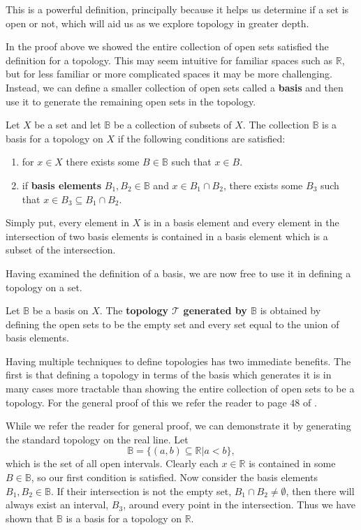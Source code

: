 \documentclass[12pt,oneside]{amsbook}
\newenvironment{defn}[1][Definition.]{\begin{trivlist}
\item[\hskip \labelsep {\bfseries #1}]}{\end{trivlist}}
\newcommand{\R}{\mathbb{R}}
\newcommand{\T}{\mathcal{T}}
\newcommand{\B}{\mathbb{B}}
\begin{document}
This is a powerful definition, principally because it helps us determine if a set is open or not, which will aid us as we explore topology in greater depth.

In the proof above we showed the entire collection of open sets satisfied the definition for a topology. This may seem intuitive for familiar spaces such as $\R$, but for less familiar or more complicated spaces it may be more challenging. Instead, we can define a smaller collection of open sets called a \textbf{basis} and then use it to generate the remaining open sets in the topology.

\begin{defn}
Let $X$ be a set and let $\mathbb{B}$ be a collection of subsets of $X$. The collection $\mathbb{B}$ is a basis for a topology on $X$ if the following conditions are satisfied:
\begin{enumerate}
\item for $x\in X$ there exists some $B\in \mathbb{B}$ such that $x\in B$.
\item if \textbf{basis elements} $B_1, B_2 \in \mathbb{B}$ and $x\in B_1 \cap B_2$, there exists some $B_3$ such that $x \in B_3 \subseteq B_1 \cap B_2$.\cite{factory}
\end{enumerate}
\end{defn}

Simply put, every element in $X$ is in a basis element and every element in the intersection of two basis elements is contained in a basis element which is a subset of the intersection.

Having examined the definition of a basis, we are now free to use it in defining a topology on a set.

\begin{defn}
Let $\B$ be a basis on $X$. The \textbf{topology $\T$ generated by $\B$} is obtained by defining the open sets to be the empty set and every set equal to the union of basis elements.
\end{defn}

Having multiple techniques to define topologies has two immediate benefits. The first is that defining a topology in terms of the basis which generates it is in many cases more tractable than showing the entire collection of open sets to be a topology. For the general proof of this we refer the reader to page $48$ of \cite{factory}.

While we refer the reader for general proof, we can demonstrate it by generating the standard topology on the real line. Let $$\mathbb{B}=\{ (a,b)\subseteq \R| a<b\},$$ which is the set of all open intervals. Clearly each $x\in \R$ is contained in some $B\in \mathbb{B}$, so our first condition is satisfied. Now consider the basis elements $B_1, B_2\in \mathbb{B}$. If their intersection is not the empty set, $B_1\cap B_2 \neq \emptyset$, then there will always exist an interval, $B_3$, around every point in the intersection. Thus we have shown that $\mathbb{B}$ is a basis for a topology on $\R$. 
\end{document}
